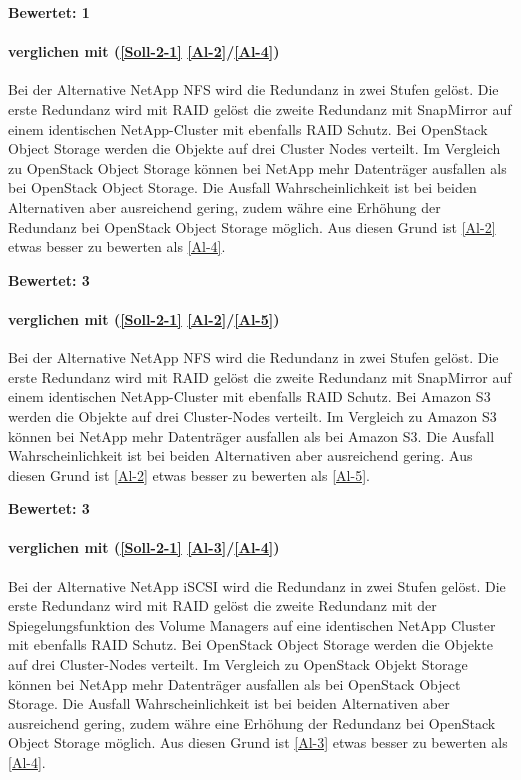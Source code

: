 \textbf{Bewertet: 1}


\paragraph*{  verglichen mit  (\ref{Soll-2-1} \ref{Al-2}/\ref{Al-4})}
Bei der Alternative NetApp NFS wird die Redundanz in zwei Stufen gelöst. Die erste Redundanz wird mit RAID gelöst die zweite Redundanz mit SnapMirror auf einem identischen NetApp-Cluster mit ebenfalls RAID Schutz. Bei OpenStack Object Storage werden die Objekte auf drei Cluster Nodes verteilt. Im Vergleich zu OpenStack Object Storage können bei NetApp mehr Datenträger ausfallen als bei OpenStack Object Storage. Die Ausfall Wahrscheinlichkeit ist bei beiden Alternativen aber ausreichend gering, zudem währe eine Erhöhung der Redundanz bei OpenStack Object Storage möglich. Aus diesen Grund ist  \ref{Al-2} etwas besser zu bewerten als  \ref{Al-4}.

\textbf{Bewertet: 3}

\paragraph*{  verglichen mit  (\ref{Soll-2-1} \ref{Al-2}/\ref{Al-5})}
Bei der Alternative NetApp NFS wird die Redundanz in zwei Stufen gelöst. Die erste Redundanz wird mit RAID gelöst die zweite Redundanz mit SnapMirror auf einem identischen NetApp-Cluster mit ebenfalls RAID Schutz. Bei Amazon S3 werden die Objekte auf drei Cluster-Nodes verteilt. Im Vergleich zu Amazon S3 können bei NetApp mehr Datenträger ausfallen als bei Amazon S3. Die Ausfall Wahrscheinlichkeit ist bei beiden Alternativen aber ausreichend gering. Aus diesen Grund ist  \ref{Al-2} etwas besser zu bewerten als  \ref{Al-5}.

\textbf{Bewertet: 3}

\paragraph*{  verglichen mit  (\ref{Soll-2-1} \ref{Al-3}/\ref{Al-4})}
Bei der Alternative NetApp iSCSI wird die Redundanz in zwei Stufen gelöst. Die erste Redundanz wird mit RAID gelöst die zweite Redundanz mit der Spiegelungsfunktion des Volume Managers auf eine identischen NetApp Cluster mit ebenfalls RAID Schutz. Bei OpenStack Object Storage werden die Objekte auf drei Cluster-Nodes verteilt. Im Vergleich zu OpenStack Objekt Storage können bei NetApp mehr Datenträger ausfallen als bei OpenStack Object Storage. Die Ausfall Wahrscheinlichkeit ist bei beiden Alternativen aber ausreichend gering, zudem währe eine Erhöhung der Redundanz bei OpenStack Object Storage möglich. Aus diesen Grund ist  \ref{Al-3} etwas besser zu bewerten als  \ref{Al-4}.

